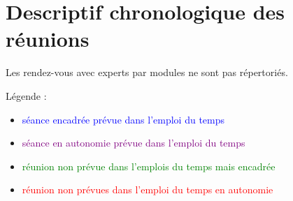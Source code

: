 \section{Descriptif chronologique des réunions}

	Les rendez-vous avec experts par modules ne sont pas répertoriés.

	Légende :
	\begin{itemize}
		\item \textcolor{Blue}{séance encadrée prévue dans l'emploi du temps}
		\item \textcolor{Purple}{séance en autonomie prévue dans l'emploi du temps}
		\item \textcolor{Green}{réunion non prévue dans l'emplois du temps mais encadrée}
		\item \textcolor{Red}{réunion non prévues dans l'emploi du temps en autonomie}
	\end{itemize}

